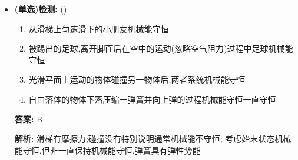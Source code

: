 \documentclass{article}
\begin{document}
\begin{itemize}
        \vspace{1em}

        \item[] \textbf{(单选)检测:} (\qquad)
        
        \begin{enumerate}[label=\Alph*.]
            \item 从滑梯上匀速滑下的小朋友机械能守恒
            \item 被踢出的足球,离开脚面后在空中的运动(忽略空气阻力)过程中足球机械能守恒
            \item 光滑平面上运动的物体碰撞另一物体后,两者系统机械能守恒
            \item 自由落体的物体下落压缩一弹簧并向上弹的过程机械能守恒一直守恒
        \end{enumerate}

        \textbf{答案:} B

        \textbf{解析:} 滑梯有摩擦力;碰撞没有特别说明通常机械能不守恒;
        考虑始末状态机械能守恒,但非一直保持机械能守恒,弹簧具有弹性势能
        
        \hspace{2em}
            


    \end{itemize}



    
\end{document}
